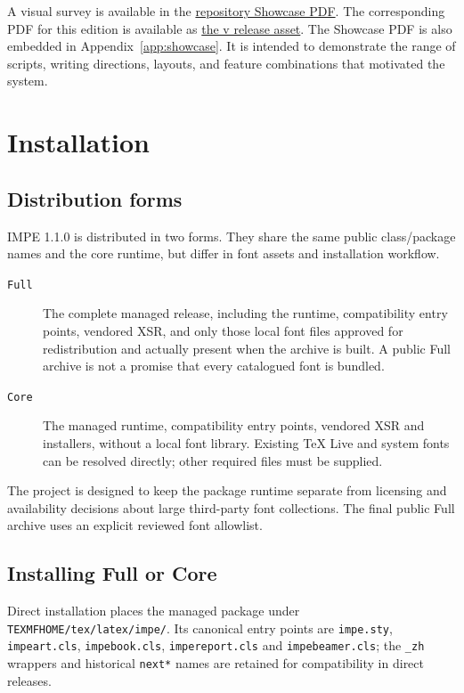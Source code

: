 \documentclass[11pt]{impeart}
\newcommand{\IMPEShowcaseURL}{https://github.com/KelvinYangBK67/IMPE-LaTeX-System/blob/main/manual/showcase/impe-showcase.pdf}
\newcommand{\IMPETaggedShowcaseURL}{https://github.com/KelvinYangBK67/IMPE-LaTeX-System/releases/download/v\IMPEVersion/impe-showcase-\IMPEVersion.pdf}
\begin{document}
A visual survey is available in the
\href{\IMPEShowcaseURL}{repository Showcase PDF}.
The corresponding PDF for this edition is available as
\href{\IMPETaggedShowcaseURL}{the v\IMPEVersion{} release asset}. The Showcase PDF is also
embedded in Appendix~\ref{app:showcase}.  It is intended to demonstrate
the range of scripts, writing directions, layouts, and feature combinations
that motivated the system.

\section{Installation}

\subsection{Distribution forms}

IMPE 1.1.0 is distributed in two forms. They share the same
public class/package names and the core \XeLaTeX{} runtime, but differ in
font assets and installation workflow.

\begin{description}
  \item[\texttt{Full}] The complete managed release, including the runtime,
    compatibility entry points, vendored XSR, and only those local font files
    approved for redistribution and actually present when the archive is built.
    A public Full archive is not a promise that every catalogued font is bundled.
  \item[\texttt{Core}] The managed runtime, compatibility entry points, vendored
    XSR and installers, without a local font library. Existing \TeX{} Live and
    system fonts can be resolved directly; other required files must be supplied.
\end{description}

The project is designed to keep the package runtime separate from licensing and
availability decisions about large third-party font collections. The final
public Full archive uses an explicit reviewed font allowlist.

\subsection{Installing Full or Core}

Direct installation places the managed package under
\texttt{TEXMFHOME/tex/latex/impe/}. Its canonical entry points are
\texttt{impe.sty}, \texttt{impeart.cls}, \texttt{impebook.cls},
\texttt{impereport.cls} and \texttt{impebeamer.cls}; the
\texttt{\_zh} wrappers and historical \texttt{next*} names are retained for
compatibility in direct releases.
\end{document}
